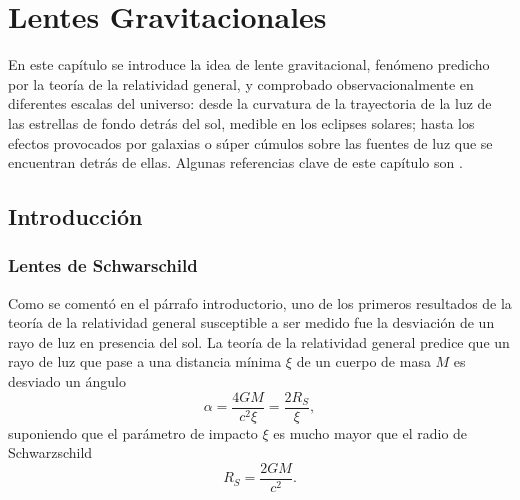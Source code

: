 \chapter{Lentes Gravitacionales}
En este capítulo se introduce la idea de lente gravitacional, fenómeno predicho por la teoría de la relatividad general, y comprobado observacionalmente en diferentes escalas del universo: desde la curvatura de la trayectoria de la luz de las estrellas de fondo detrás del sol, medible en los eclipses solares; hasta los efectos provocados por galaxias o súper cúmulos sobre las fuentes de luz que se encuentran detrás de ellas. Algunas referencias clave de este capítulo son \cite{schneider_ehlers_falco_1992,weinberg_2016}.
\section{Introducción}
\subsection{Lentes de Schwarschild}
Como se comentó en el párrafo introductorio, uno de los primeros resultados de la teoría de la relatividad general susceptible a ser medido fue la desviación de un rayo de luz en presencia del sol. La teoría de la relatividad general predice que un rayo de luz que pase a una distancia mínima $\xi$ de un cuerpo de masa $M$ es desviado un ángulo
\begin{equation}\label{deflection}
	\alpha=\frac{4GM}{c^2\xi}=\frac{2R_S}{\xi},
\end{equation}
suponiendo que el parámetro de impacto $\xi$ es mucho mayor que el radio de Schwarzschild \cite{weinberg_2016}
\begin{equation}
	R_S=\frac{2GM}{c^2}.
\end{equation}

